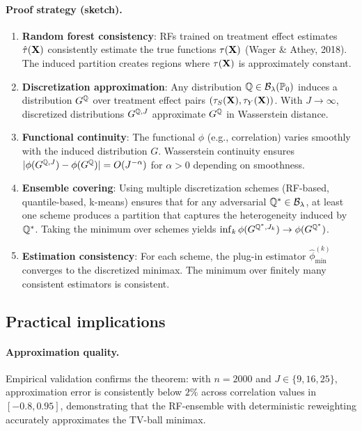\documentclass{article}
\newcommand{\PP}{\mathbb{P}}
\begin{document}
\paragraph{Proof strategy (sketch).}
\begin{enumerate}
    \item \textbf{Random forest consistency}: RFs trained on treatment effect estimates $\hat{\tau}(\mathbf{X})$ consistently estimate the true functions $\tau(\mathbf{X})$ (Wager \& Athey, 2018). The induced partition creates regions where $\tau(\mathbf{X})$ is approximately constant.

    \item \textbf{Discretization approximation}: Any distribution $\Q \in \cB_\lambda(\PP_0)$ induces a distribution $G^{\mathbb{Q}}$ over treatment effect pairs $(\tau_S(\mathbf{X}), \tau_Y(\mathbf{X}))$. With $J \to \infty$, discretized distributions $G^{\mathbb{Q}, J}$ approximate $G^{\mathbb{Q}}$ in Wasserstein distance.

    \item \textbf{Functional continuity}: The functional $\phi$ (e.g., correlation) varies smoothly with the induced distribution $G$. Wasserstein continuity ensures $|\phi(G^{\mathbb{Q}, J}) - \phi(G^{\mathbb{Q}})| = O(J^{-\alpha})$ for $\alpha > 0$ depending on smoothness.

    \item \textbf{Ensemble covering}: Using multiple discretization schemes (RF-based, quantile-based, k-means) ensures that for any adversarial $\mathbb{Q}^* \in \mathcal{B}_\lambda$, at least one scheme produces a partition that captures the heterogeneity induced by $\mathbb{Q}^*$. Taking the minimum over schemes yields $\inf_k \phi(G^{\mathbb{Q}^*, J_k}) \to \phi(G^{\mathbb{Q}^*})$.

    \item \textbf{Estimation consistency}: For each scheme, the plug-in estimator $\hat{\phi}_{\min}^{(k)}$ converges to the discretized minimax. The minimum over finitely many consistent estimators is consistent.
\end{enumerate}

\subsection{Practical implications}

\paragraph{Approximation quality.}
Empirical validation confirms the theorem: with $n = 2000$ and $J \in \{9, 16, 25\}$, approximation error is consistently below $2\%$ across correlation values in $[-0.8, 0.95]$, demonstrating that the RF-ensemble with deterministic reweighting accurately approximates the TV-ball minimax.
\end{document}
